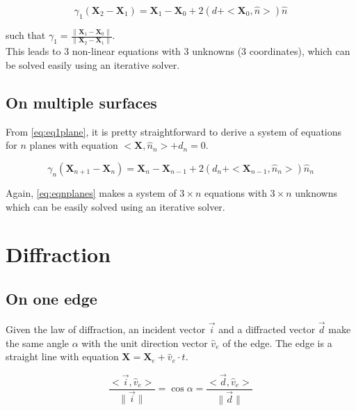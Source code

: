 \documentclass[french,10pt]{article}
\begin{document}
    \begin{equation}\label{eq:eq1plane}
        {\gamma_1}\left(\pmb{X}_2 - \pmb{X}_1 \right) = \pmb{X}_1 - \pmb{X}_0 + 2\left(d + <\pmb{X}_0, \hat{n} > \right)\hat{n}
    \end{equation}

    such that $\gamma_1 = \frac{\|\pmb{X}_1 - \pmb{X}_0\|}{\|\pmb{X}_2 - \pmb{X}_1\|}$.\\

    This leads to 3 non-linear equations with 3 unknowns (3 coordinates), which can be solved easily using an iterative solver.

    \subsection{On multiple surfaces}

    From \eqref{eq:eq1plane}, it is pretty straightforward to derive a system of equations for $n$ planes with equation $<\pmb{X},\hat{n}_n> + d_n = 0$.

    \begin{equation}\label{eq:eqnplanes}
        {\gamma_n}\left(\pmb{X}_{n+1} - \pmb{X}_n \right) = \pmb{X}_n - \pmb{X}_{n-1} + 2\left(d_n + <\pmb{X}_{n-1}, \hat{n}_n > \right)\hat{n}_n
    \end{equation}

    Again, \eqref{eq:eqnplanes} makes a system of $3\times n$ equations with $3 \times n$ unknowns which can be easily solved using an iterative solver.

\section{Diffraction}

    \subsection{On one edge}

    Given the law of diffraction, an incident vector $\vec{i}$ and a diffracted vector $\vec{d}$ make the same angle $\alpha$ with the unit direction vector $\hat{v}_e$ of the edge. The edge is a straight line with equation $\pmb{X} = \pmb{X}_e + \hat{v}_e \cdot t$.

    \begin{equation}
        \frac{<\vec{i}, \hat{v}_e>}{\|\vec{i}\|} = \cos\alpha = \frac{<\vec{d}, \hat{v}_e>}{\|\vec{d}\|}
    \end{equation}
\end{document}
